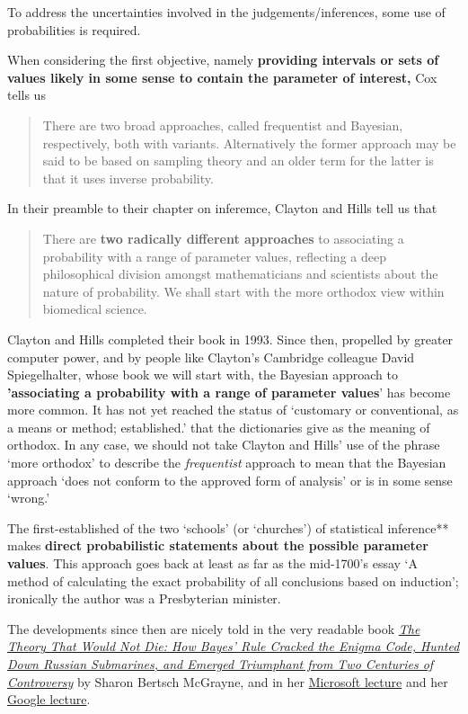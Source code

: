 \documentclass[]{book}
\begin{document}
To address the uncertainties involved in the judgements/inferences, some use of probabilities is required.

When considering the first objective, namely \textbf{providing intervals or sets of values likely in some sense to contain the parameter of interest,} Cox tells us

\begin{quote}
There are two broad approaches, called frequentist and Bayesian, respectively, both with variants. Alternatively the former approach may be said to be based on sampling theory and an older term for the latter is that it uses inverse probability.
\end{quote}

In their preamble to their chapter on inferemce, Clayton and Hills tell us that

\begin{quote}
There are \textbf{two radically different approaches} to associating a probability with a range of parameter values, reflecting a deep philosophical division amongst mathematicians and scientists about the nature of probability. We shall start with the more orthodox view within biomedical science.
\end{quote}

Clayton and Hills completed their book in 1993.
Since then, propelled by greater computer power, and by people like
Clayton's Cambridge colleague David Spiegelhalter, whose book we will start with, the Bayesian approach to \textbf{'associating a probability with a range of parameter values}' has become more common. It has not yet reached the status of `customary or conventional, as a means or method; established.' that the dictionaries give as the meaning of orthodox. In any case, we should not take Clayton and Hills' use of the phrase `more orthodox' to describe the \emph{frequentist} approach to mean
that the Bayesian approach `does not conform to the approved form of analysis' or is in some sense `wrong.'

The first-established of the two `schools' (or `churches') of statistical inference** makes \textbf{direct probabilistic statements about the possible parameter values}. This approach goes back at least as far as the mid-1700's essay `A method of calculating the exact probability of all conclusions based on induction'; ironically the author was a Presbyterian minister.

The developments since then are nicely told in the very readable book \href{https://www.amazon.com/Theory-That-Would-Not-Die-ebook/dp/B0050QB3EQ}{\emph{The Theory That Would Not Die: How Bayes' Rule Cracked the Enigma Code, Hunted Down Russian Submarines, and Emerged Triumphant from Two Centuries of Controversy}} by Sharon Bertsch McGrayne, and in her \href{https://www.youtube.com/embed/2o-_BGqYM5U}{Microsoft lecture}
and her \href{https://www.youtube.com/embed/8oD6eBkjF9o}{Google lecture}.
\end{document}
